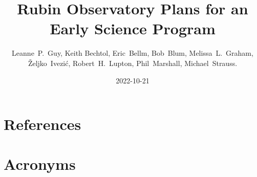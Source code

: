 \documentclass[DM,authoryear,toc]{lsstdoc}
\title{Rubin Observatory Plans for an Early Science Program}
\author{%
Leanne~P.~Guy, Keith Bechtol, Eric~Bellm, Bob~Blum, Melissa~L.~Graham,
\v{Z}eljko~Ivezi\'{c}, Robert~H.~Lupton, Phil~Marshall, Michael~Strauss.}
\date{2022-10-21}
\begin{document}
\maketitle


\clearpage










\appendix
\section{References} \label{sec:bib}
\renewcommand{\refname}{} %


\section{Acronyms} \label{sec:acronyms}

\end{document}
